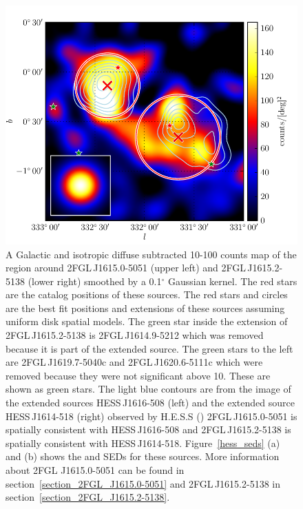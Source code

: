 \documentclass[12pt,preprint]{aastex}
\newcommand{\gev}{\text{GeV}\xspace}
\newcommand{\tev}{\text{TeV}\xspace}
\renewcommand{\deg}{\ensuremath{^\circ}\xspace}
\begin{document}
\begin{figure}
  \begin{center}
    \includegraphics[type=pdf,ext=.pdf,read=.pdf]{source_plots/source_1FGL_J1613.6-5100c}
  \end{center}
  \caption{
    A Galactic and isotropic diffuse subtracted 10-100
    \gev counts map of the region around 2FGL\,J1615.0-5051 (upper
    left) and 2FGL\,J1615.2-5138 (lower right) smoothed by a 0.1\deg
    Gaussian kernel.  The red stars are the catalog positions of these
    sources.  The red stars and circles are the best fit positions and
    extensions of these sources assuming uniform disk spatial models.
    The green star inside the extension of 2FGL\,J1615.2-5138  is
    2FGL\,J1614.9-5212 which was removed because it is part of the
    extended source.  The green stars to the left are 2FGL\,J1619.7-5040c
    and 2FGL\,J1620.6-5111c which were removed because they were
    not significant above 10\gev. These are shown as green stars.
    The light blue
    contours are from the \tev image 
    of the extended sources
    HESS\,J1616-508 (left) and the extended source HESS\,J1614-518
    (right)
    observed by H.E.S.S
    (\cite{hess_plane_survey})
    2FGL\,J1615.0-5051 is spatially consistent with HESS\,J1616-508 and
    2FGL\,J1615.2-5138 is spatially consistent with HESS\,J1614-518.
    Figure~\ref{hess_seds} (a) and (b) shows the \gev and \tev SEDs for
    these sources.
    More information about 2FGL J1615.0-5051 can be found in
    section~\ref{section_2FGL_J1615.0-5051} and 2FGL\,J1615.2-5138 in
    section~\ref{section_2FGL_J1615.2-5138}.
  }\label{1FGL_J1613.6-5100c}
\end{figure}
\end{document}
